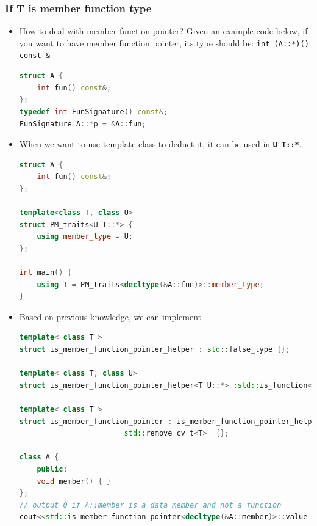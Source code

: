 \documentclass[a4paper,11pt,twoside]{book}
\begin{document}
\subsubsection{If T is member function type}
\begin{itemize}
	\item How to deal with member function pointer? Given an example code below, if you want to have member function pointer, its type should be: \texttt{int (A::*)() const \&} 
\begin{lstlisting}[frame=single, language=c++]
struct A {
	int fun() const&;
};
typedef int FunSignature() const&;
FunSignature A::*p = &A::fun;
\end{lstlisting}
\item When we want to use template class to deduct it, it can be used in \textbf{\texttt{U T::*}}.
\begin{lstlisting}[frame=single, language=c++]
struct A {
	int fun() const&;
};

template<class T, class U>
struct PM_traits<U T::*> {
	using member_type = U;
};

int main() {
	using T = PM_traits<decltype(&A::fun)>::member_type; 
}
\end{lstlisting}

\item Based on previous knowledge, we can implement 
\begin{lstlisting}[frame=single, language=c++]
template< class T >
struct is_member_function_pointer_helper : std::false_type {};

template< class T, class U>
struct is_member_function_pointer_helper<T U::*> :std::is_function<T> {};

template< class T >
struct is_member_function_pointer : is_member_function_pointer_helper<
                        std::remove_cv_t<T>  {};

class A {
	public:
	void member() { }
};
// output 0 if A::member is a data member and not a function
cout<<std::is_member_function_pointer<decltype(&A::member)>::value
\end{lstlisting}
\end{itemize}
\end{document}
